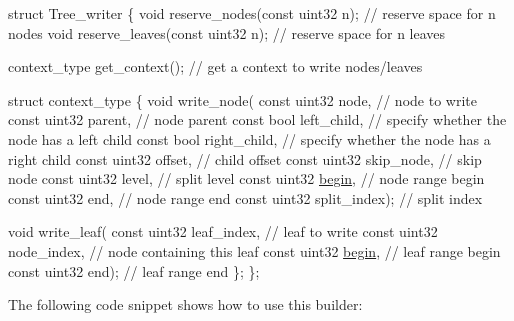 \begin{DoxyCode}
\textcolor{keyword}{struct }Tree\_writer
\{
   \textcolor{keywordtype}{void} reserve\_nodes(\textcolor{keyword}{const} uint32 n);  \textcolor{comment}{// reserve space for n nodes}
   \textcolor{keywordtype}{void} reserve\_leaves(\textcolor{keyword}{const} uint32 n); \textcolor{comment}{// reserve space for n leaves}

   context\_type get\_context();          \textcolor{comment}{// get a context to write nodes/leaves}

   \textcolor{keyword}{struct }context\_type
   \{
       \textcolor{keywordtype}{void} write\_node(
          \textcolor{keyword}{const} uint32 node,          \textcolor{comment}{// node to write}
          \textcolor{keyword}{const} uint32 parent,        \textcolor{comment}{// node parent}
          \textcolor{keyword}{const} \textcolor{keywordtype}{bool}   left\_child,    \textcolor{comment}{// specify whether the node has a left child}
          \textcolor{keyword}{const} \textcolor{keywordtype}{bool}   right\_child,   \textcolor{comment}{// specify whether the node has a right child}
          \textcolor{keyword}{const} uint32 offset,        \textcolor{comment}{// child offset}
          \textcolor{keyword}{const} uint32 skip\_node,     \textcolor{comment}{// skip node}
          \textcolor{keyword}{const} uint32 level,         \textcolor{comment}{// split level}
          \textcolor{keyword}{const} uint32 \hyperlink{namespacecugar_a2121df08f967e232ea5fe0ee378dee67}{begin},         \textcolor{comment}{// node range begin}
          \textcolor{keyword}{const} uint32 end,           \textcolor{comment}{// node range end}
          \textcolor{keyword}{const} uint32 split\_index);  \textcolor{comment}{// split index}

       \textcolor{keywordtype}{void} write\_leaf(
          \textcolor{keyword}{const} uint32 leaf\_index,    \textcolor{comment}{// leaf to write}
          \textcolor{keyword}{const} uint32 node\_index,    \textcolor{comment}{// node containing this leaf}
          \textcolor{keyword}{const} uint32 \hyperlink{namespacecugar_a2121df08f967e232ea5fe0ee378dee67}{begin},         \textcolor{comment}{// leaf range begin}
          \textcolor{keyword}{const} uint32 end);          \textcolor{comment}{// leaf range end}
   \};
\};
\end{DoxyCode}


The following code snippet shows how to use this builder\+:


